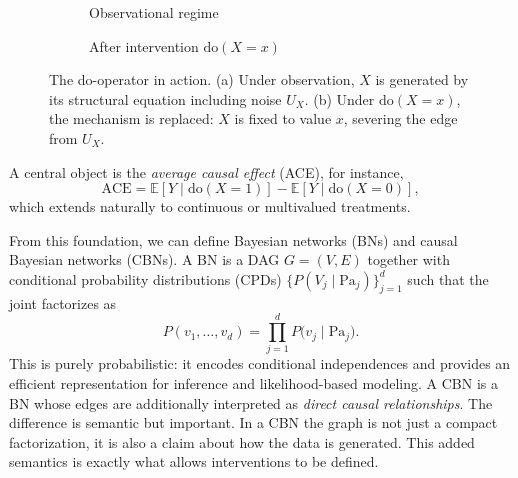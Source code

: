 \documentclass{article}
\providecommand{\do}{\mathrm{do}}
\begin{document}
\begin{figure}[htbp]
\centering
\begin{subfigure}[b]{0.45\linewidth}
\centering
{}
\caption{Observational regime}
\label{fig:do-obs}
\end{subfigure}
\hfill
\begin{subfigure}[b]{0.45\linewidth}
\centering
{}
\caption{After intervention $\do(X{=}x)$}
\label{fig:do-int}
\end{subfigure}
\caption{The do-operator in action. (a) Under observation, $X$ is generated by its structural equation including noise $U_X$. (b) Under $\do(X{=}x)$, the mechanism is replaced: $X$ is fixed to value $x$, severing the edge from $U_X$.}
\label{fig:do-intervention}
\end{figure}

A central object is the \emph{average causal effect} (ACE), for instance,
\[
\mathrm{ACE} = \mathbb{E}[Y \mid \do(X=1)] - \mathbb{E}[Y \mid \do(X=0)],
\]
which extends naturally to continuous or multivalued treatments.

From this foundation, we can define Bayesian networks (BNs) and causal Bayesian networks (CBNs). A BN is a DAG \(G=(V,E)\) together with conditional probability distributions (CPDs) \(\{P(V_j \mid \mathrm{Pa}_j)\}_{j=1}^d\) such that the joint factorizes as
\[
P(v_1,\dots,v_d) =
\prod_{j=1}^d P\bigl(v_j \mid \mathrm{Pa}_j\bigr).
\]
This is purely probabilistic: it encodes conditional independences and provides an efficient representation for inference and likelihood-based modeling. A CBN is a BN whose edges are additionally interpreted as \emph{direct causal relationships}. The difference is semantic but important. In a CBN the graph is not just a compact factorization, it is also a claim about how the data is generated. This added semantics is exactly what allows interventions to be defined.
\end{document}
